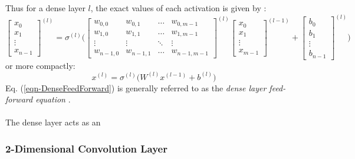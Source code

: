 \documentclass[12pt,letterpaper]{article}
\begin{document}
Thus for a dense layer $l$, the exact values of each activation is given by \cite{Geron,Loy}:
\begin{equation}
\begin{bmatrix}
x_0 \\ x_1 \\ \vdots \\ x_{n-1}
\end{bmatrix}^{(l)} =
\sigma^{(l)} \Bigg(
\begin{bmatrix}
w_{0,0} & w_{0,1} & \hdots & w_{0,m-1} \\
w_{1,0} & w_{1,1} & \hdots & w_{1,m-1} \\
\vdots & \vdots & \ddots & \vdots  \\
w_{n-1,0} & w_{n-1,1} & \hdots & w_{n-1,m-1} 
\end{bmatrix}^{(l)} 
\begin{bmatrix}
x_0 \\ x_1 \\ \vdots \\ x_{m-1}
\end{bmatrix}^{(l-1)} +
\begin{bmatrix}
b_0 \\ b_1 \\ \vdots \\ b_{n-1}
\end{bmatrix}^{(l)} \Bigg)
\end{equation}
or more compactly:
\begin{equation}
\label{eqn-DenseFeedForward}
x^{(l)} = \sigma^{(l)} \Big( W^{(l)} x^{(l-1)} + b^{(l)} \Big)
\end{equation}
Eq. (\ref{eqn-DenseFeedForward}) is generally referred to as the \textit{dense layer feed-forward equation} \cite{Goodfellow}. 

\paragraph*{}The dense layer acts as an 


\subsubsection{2-Dimensional Convolution Layer}
\label{subsubsec-Conv2DLayer}
\end{document}
